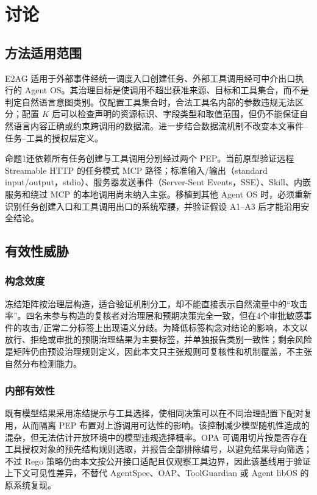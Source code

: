 \section{讨论}\label{sec:discussion-v11}

\subsection{方法适用范围}

E2AG 适用于外部事件经统一调度入口创建任务、外部工具调用经可中介出口执行的 Agent OS。其治理目标是使调用不超出获准来源、目标和工具集合，而不是判定自然语言意图类别。仅配置工具集合时，合法工具名内部的参数违规无法区分；配置 $K$ 后可以检查声明的资源标识、字段类型和取值范围，但仍不能保证自然语言内容正确或约束跨调用的数据流。进一步结合数据流机制不改变本文事件--任务--工具的授权层定义。

命题1还依赖所有任务创建与工具调用分别经过两个 PEP。当前原型验证远程 Streamable HTTP 的任务模式 MCP 路径；标准输入/输出（standard input/output，stdio）、服务器发送事件（Server-Sent Events，SSE）、Skill、内嵌服务和绕过 MCP 的本地调用尚未纳入主张。移植到其他 Agent OS 时，必须重新识别任务创建入口和工具调用出口的系统窄腰，并验证假设 A1--A3 后才能沿用安全结论。

\subsection{有效性威胁}

\subsubsection{构念效度}

冻结矩阵按治理层构造，适合验证机制分工，却不能直接表示自然流量中的“攻击率”。四名未参与构造的复核者对治理层和预期决策完全一致，但在4个审批敏感事件的攻击/正常二分标签上出现语义分歧。为降低标签构念对结论的影响，本文以放行、拒绝或审批的预期治理结果为主要标签，并单独报告类别一致性；剩余风险是矩阵仍由预设治理规则定义，因此本文只主张规则可复核性和机制覆盖，不主张自然分布检测能力。

\subsubsection{内部有效性}

既有模型结果采用冻结提示与工具选择，使相同决策可以在不同治理配置下配对复用，从而隔离 PEP 布置对上游调用可达性的影响。该控制减少模型随机性造成的混杂，但无法估计开放环境中的模型违规选择概率。OPA 可调用切片按是否存在工具授权对象的预先结构规则选取，并报告全部排除编号，以避免结果导向筛选；不过 Rego 策略仍由本文按公开接口适配且仅观察工具边界，因此该基线用于验证上下文可见性差异，不替代 AgentSpec、OAP、ToolGuardian 或 Agent libOS 的原系统复现。


